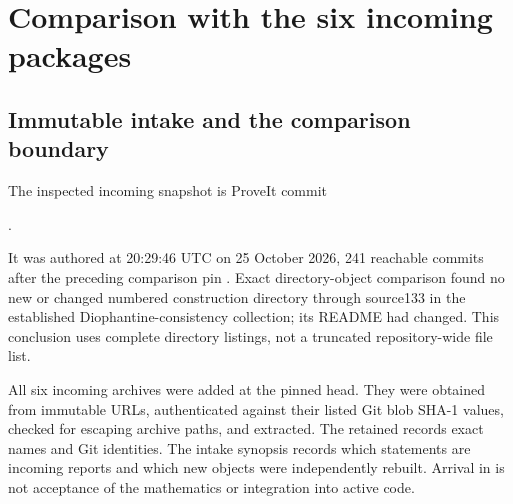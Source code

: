 \section{Comparison with the six incoming packages}
\label{sec:comparison}
\subsection{Immutable intake and the comparison boundary}
The inspected incoming snapshot is ProveIt commit
\begin{center}\small
{}.
\end{center}
It was authored at 20:29:46 UTC on 25 October 2026, 241 reachable commits
after the preceding comparison pin
.
Exact directory-object comparison found no new or changed numbered
construction directory through source133 in the established
Diophantine-consistency collection; its README had changed. This conclusion
uses complete directory listings, not a truncated repository-wide file list.

All six incoming archives were added at the pinned head. They were obtained
from immutable URLs, authenticated against their listed Git blob SHA-1
values, checked for escaping archive paths, and extracted. The retained
 records exact names and Git identities.
The intake synopsis records which statements are incoming reports and which
new objects were independently rebuilt. Arrival in 
is not acceptance of the mathematics or integration into active code.

